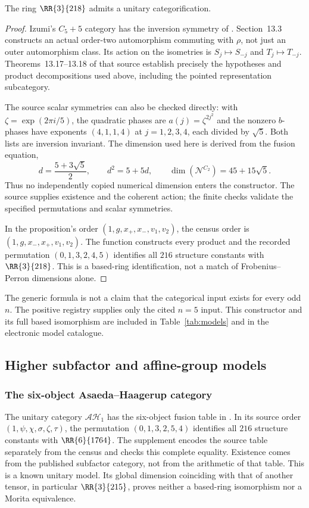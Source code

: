 \begin{corollary}\label{cor:inversion-five}
The ring $\RR{3}{218}$ admits a unitary categorification.
\end{corollary}
\begin{proof}
Izumi's $C_5+5$ category has the inversion symmetry of
\cite[Example~13.8]{Izumi}. Section~13.3 constructs an actual order-two
automorphism commuting with $\rho$, not just an outer automorphism
class. Its action on the isometries is $S_j\mapsto S_{-j}$ and
$T_j\mapsto T_{-j}$. Theorems~13.17--13.18 of that source establish
precisely the hypotheses and product decompositions used above,
including the pointed representation subcategory.

The source scalar symmetries can also be checked directly: with
$\zeta=\exp(2\pi i/5)$, the quadratic phases are
$a(j)=\zeta^{2j^2}$ and the nonzero $b$-phases have exponents
$(4,1,1,4)$ at $j=1,2,3,4$, each divided by $\sqrt5$.
Both lists are inversion invariant. The dimension used here is derived
from the fusion equation,
\[
 d=\frac{5+3\sqrt5}{2},\qquad d^2=5+5d,
 \qquad\dim(\mathcal N^{C_2})=45+15\sqrt5.
\]
Thus no independently copied numerical dimension enters the constructor.
The source supplies existence and the coherent action; the finite
checks validate the specified permutations and scalar symmetries.

In the proposition's order $(1,g,x_+,x_-,v_1,v_2)$, the census order is
$(1,g,x_-,x_+,v_1,v_2)$. The function
 constructs every product and the recorded
permutation $(0,1,3,2,4,5)$ identifies all $216$ structure constants with
$\RR{3}{218}$. This is a based-ring identification, not a match of
Frobenius--Perron dimensions alone.
\end{proof}

The generic formula is not a claim that the categorical input exists
for every odd $n$. The positive registry supplies only the cited $n=5$
input. This constructor and its full based isomorphism are included in
Table~\ref{tab:models} and in the electronic model catalogue.

\subsection{Higher subfactor and affine-group models}\label{sec:through7-models}
\subsubsection{The six-object Asaeda--Haagerup category}
The unitary category $\mathcal{AH}_1$ has the six-object fusion table
in \cite[Table~1]{GSAH}. In its source order
$(1,\psi,\chi,\sigma,\zeta,\tau)$, the permutation
$(0,1,3,2,5,4)$ identifies all $216$ structure constants with
$\RR{6}{1764}$. The supplement encodes the source table separately from
the census and checks this complete equality. Existence comes from the
published subfactor category, not from the arithmetic of that table.
This is a known unitary model. Its global dimension coinciding with
that of another tensor, in particular $\RR{3}{215}$, proves neither a
based-ring isomorphism nor a Morita equivalence.

